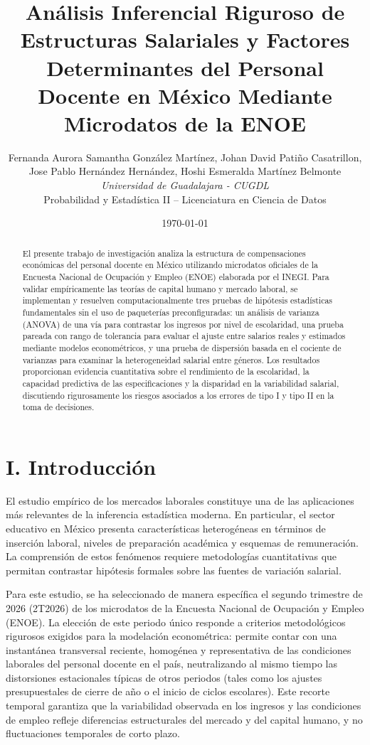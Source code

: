 \documentclass[10pt,twocolumn,a4paper]{article}
\title{\textbf{Análisis Inferencial Riguroso de Estructuras Salariales y Factores Determinantes del Personal Docente en México Mediante Microdatos de la ENOE}}
\author{Fernanda Aurora Samantha González Martínez, Johan David Patiño Casatrillon, \\ Jose Pablo Hernández Hernández, Hoshi Esmeralda Martínez Belmonte \\\textit{Universidad de Guadalajara - CUGDL} \\ \small Probabilidad y Estadística II -- Licenciatura en Ciencia de Datos}
\date{\today}
\begin{document}
\maketitle

\begin{abstract}
El presente trabajo de investigación analiza la estructura de compensaciones económicas del personal docente en México utilizando microdatos oficiales de la Encuesta Nacional de Ocupación y Empleo (ENOE) elaborada por el INEGI. Para validar empíricamente las teorías de capital humano y mercado laboral, se implementan y resuelven computacionalmente tres pruebas de hipótesis estadísticas fundamentales sin el uso de paqueterías preconfiguradas: un análisis de varianza (ANOVA) de una vía para contrastar los ingresos por nivel de escolaridad, una prueba pareada con rango de tolerancia para evaluar el ajuste entre salarios reales y estimados mediante modelos econométricos, y una prueba de dispersión basada en el cociente de varianzas para examinar la heterogeneidad salarial entre géneros. Los resultados proporcionan evidencia cuantitativa sobre el rendimiento de la escolaridad, la capacidad predictiva de las especificaciones y la disparidad en la variabilidad salarial, discutiendo rigurosamente los riesgos asociados a los errores de tipo I y tipo II en la toma de decisiones.
\end{abstract}

\section{I. Introducción}
El estudio empírico de los mercados laborales constituye una de las aplicaciones más relevantes de la inferencia estadística moderna. En particular, el sector educativo en México presenta características heterogéneas en términos de inserción laboral, niveles de preparación académica y esquemas de remuneración. La comprensión de estos fenómenos requiere metodologías cuantitativas que permitan contrastar hipótesis formales sobre las fuentes de variación salarial.

Para este estudio, se ha seleccionado de manera específica el segundo trimestre de 2026 (2T2026) de los microdatos de la Encuesta Nacional de Ocupación y Empleo (ENOE). La elección de este periodo único responde a criterios metodológicos rigurosos exigidos para la modelación econométrica: permite contar con una instantánea transversal reciente, homogénea y representativa de las condiciones laborales del personal docente en el país, neutralizando al mismo tiempo las distorsiones estacionales típicas de otros periodos (tales como los ajustes presupuestales de cierre de año o el inicio de ciclos escolares). Este recorte temporal garantiza que la variabilidad observada en los ingresos y las condiciones de empleo refleje diferencias estructurales del mercado y del capital humano, y no fluctuaciones temporales de corto plazo.
\end{document}
